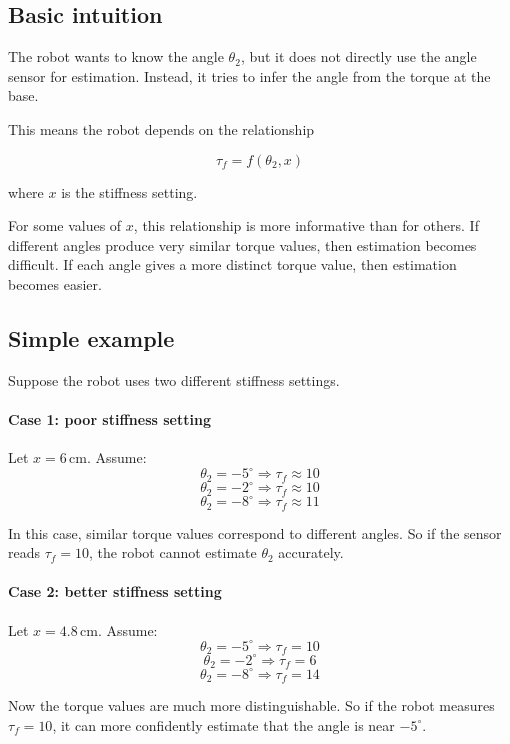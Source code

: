 \subsection*{Basic intuition}

The robot wants to know the angle \( \theta_2 \), but it does not directly use the angle sensor for estimation. Instead, it tries to infer the angle from the torque at the base.

This means the robot depends on the relationship

\[
\tau_f = f(\theta_2, x)
\]

where \( x \) is the stiffness setting.

For some values of \( x \), this relationship is more informative than for others. If different angles produce very similar torque values, then estimation becomes difficult. If each angle gives a more distinct torque value, then estimation becomes easier.

\subsection*{Simple example}

Suppose the robot uses two different stiffness settings.

\paragraph{Case 1: poor stiffness setting}
Let \( x = 6 \,\text{cm} \). Assume:
\[
\theta_2 = -5^\circ \Rightarrow \tau_f \approx 10
\]
\[
\theta_2 = -2^\circ \Rightarrow \tau_f \approx 10
\]
\[
\theta_2 = -8^\circ \Rightarrow \tau_f \approx 11
\]

In this case, similar torque values correspond to different angles. So if the sensor reads \( \tau_f = 10 \), the robot cannot estimate \( \theta_2 \) accurately.

\paragraph{Case 2: better stiffness setting}
Let \( x = 4.8 \,\text{cm} \). Assume:
\[
\theta_2 = -5^\circ \Rightarrow \tau_f = 10
\]
\[
\theta_2 = -2^\circ \Rightarrow \tau_f = 6
\]
\[
\theta_2 = -8^\circ \Rightarrow \tau_f = 14
\]

Now the torque values are much more distinguishable. So if the robot measures \( \tau_f = 10 \), it can more confidently estimate that the angle is near \( -5^\circ \).

